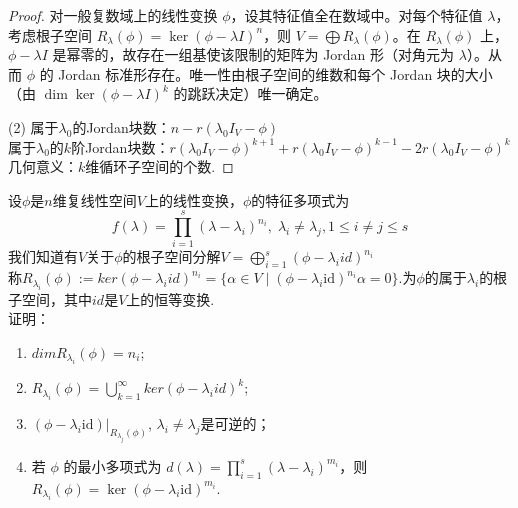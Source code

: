 \documentclass[lang=cn,12pt]{elegantbook}
\begin{document}
\begin{proof}
        对一般复数域上的线性变换 \(\phi\)，设其特征值全在数域中。对每个特征值 \(\lambda\)，考虑根子空间 \(R_\lambda(\phi)=\ker(\phi-\lambda I)^n\)，则 \(V=\bigoplus R_\lambda(\phi)\)。在 \(R_\lambda(\phi)\) 上，\(\phi-\lambda I\) 是幂零的，故存在一组基使该限制的矩阵为 Jordan 形（对角元为 \(\lambda\)）。从而 \(\phi\) 的 Jordan 标准形存在。唯一性由根子空间的维数和每个 Jordan 块的大小（由 \(\dim\ker(\phi-\lambda I)^k\) 的跳跃决定）唯一确定。

    (2) 属于$\lambda_0$的Jordan块数：$n - r(\lambda_0I_V - \phi)$\\
        属于$\lambda_0$的$k$阶Jordan块数：$r(\lambda_0I_V - \phi)^{k+1} + r(\lambda_0I_V - \phi)^{k-1}- 2r(\lambda_0I_V - \phi)^k$\\
        几何意义：$k$维循环子空间的个数.
\end{proof}

\begin{example}
    设$\phi$是$n$维复线性空间$V$上的线性变换，$\phi$的特征多项式为$$f(\lambda) = \prod_{i = 1}^s(\lambda - \lambda_i)^{n_i},\;\lambda_i \neq \lambda_j ,1 \leq i \neq j \leq s $$
    我们知道有$V$关于$\phi$的根子空间分解$V = \bigoplus_{i=1}^s (\phi-\lambda_i id)^{n_i}$ \\
    称$R_{\lambda_i}(\phi) := ker(\phi-\lambda_i id)^{n_i} = \{\alpha \in V \mid (\phi - \lambda_i \mathrm{id})^{n_i}\alpha = 0\}.$为$\phi$的属于$\lambda_i$的根子空间，其中$id$是$V$上的恒等变换.\\
    证明：
    \begin{enumerate}
        \item[(1)]$dimR_{\lambda_i}(\phi) = n_i$;
        \item[(2)]$R_{\lambda_i}(\phi) = \bigcup_{k = 1}^{\infty} ker(\phi - \lambda_i id)^k$;
        \item[(3)] \((\phi - \lambda_i \mathrm{id})|_{R_{\lambda_j}(\phi)}\), \(\lambda_i \neq \lambda_j\)是可逆的；
        \item[(4)]若 \(\phi\) 的最小多项式为 \(d(\lambda) = \prod_{i=1}^{s}(\lambda - \lambda_i)^{m_i}\)，则 \(R_{\lambda_i}(\phi) = \ker (\phi - \lambda_i \mathrm{id})^{m_i}\).
    \end{enumerate}
\end{example}
\end{document}
